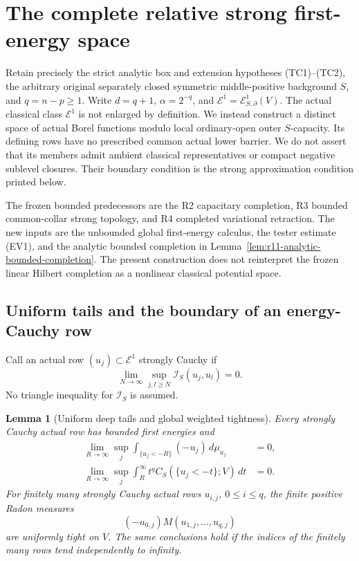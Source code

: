 \documentclass[11pt,a4paper]{article}
\numberwithin{equation}{section}
\newtheorem{lemma}[theorem]{Lemma}
\theoremstyle{definition}
\theoremstyle{remark}
\begin{document}


\section{The complete relative strong first-energy space}
\label{sec:r11-strong-first-energy-completion}

Retain precisely the strict analytic box and extension hypotheses
(TC1)--(TC2), the arbitrary original separately closed symmetric
middle-positive background $S$, and $q=n-p\geq1$. Write
$d=q+1$, $\alpha=2^{-q}$, and $\mathcal E^1=
\mathcal E^1_{S,\partial}(V)$. The actual classical class
$\mathcal E^1$ is not enlarged by definition. We instead construct
a distinct space of actual Borel functions modulo local ordinary-open
outer $S$-capacity. Its defining rows have no prescribed common
actual lower barrier. We do not assert that its members admit
ambient classical representatives or compact negative sublevel
closures. Their boundary condition is the strong approximation
condition printed below.

The frozen bounded predecessors are the R2 capacitary completion,
R3 bounded common-collar strong topology, and R4 completed
variational retraction. The new inputs are the unbounded global
first-energy calculus, the tester estimate (EV1), and the analytic
bounded completion in Lemma~\ref{lem:r11-analytic-bounded-completion}.
The present construction does not reinterpret the frozen linear
Hilbert completion as a nonlinear classical potential space.

\subsection{Uniform tails and the boundary of an energy-Cauchy row}

Call an actual row $(u_j)\subset\mathcal E^1$ strongly Cauchy if
\[
               \lim_{N\to\infty}\sup_{j,l\geq N}
                    \mathscr I_S(u_j,u_l)=0.
 \tag{IC1}
\]
No triangle inequality for $\mathscr I_S$ is assumed.

\begin{lemma}[Uniform deep tails and global weighted tightness]
\label{lem:r11-strong-cauchy-uniform-tails}
Every strongly Cauchy actual row has bounded first energies and
\[
 \begin{split}
 \lim_{R\to\infty}\sup_j
     \int_{\{u_j<-R\}}(-u_j)\,d\mu_{u_j}&=0,\\
 \lim_{R\to\infty}\sup_j
     \int_R^\infty t^q C_S(\{u_j<-t\};V)\,dt&=0.
 \end{split}
 \tag{IC2}
\]
For finitely many strongly Cauchy actual rows $u_{i,j}$,
$0\leq i\leq q$, the finite positive Radon measures
\[
            (-u_{0,j})M(u_{1,j},\ldots,u_{q,j})
 \tag{IC3}
\]
are uniformly tight on $V$. The same conclusions hold if the
indices of the finitely many rows tend independently to infinity.
\end{lemma}
\end{document}
